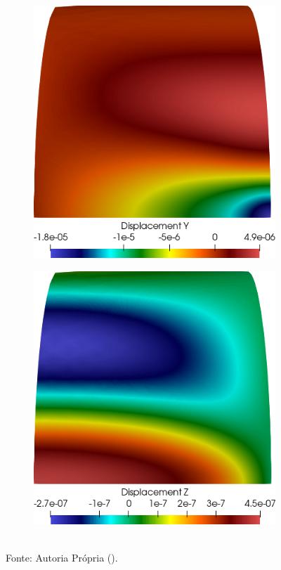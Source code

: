 \begin{figure}[h!]
\begin{subfigure}{0.3\textwidth}
    \end{subfigure}
    \begin{subfigure}{0.3\textwidth}
        \includegraphics[width=\linewidth]{Figuras/cylinder-shell/uy.png}
    \end{subfigure}
    \begin{subfigure}{0.3\textwidth}
        \includegraphics[width=\linewidth]{Figuras/cylinder-shell/uz.png}
    \end{subfigure}
    \\Fonte: Autoria Própria (\the\year).
    \label{fig:cylinder-shell-disp}
\end{figure}

